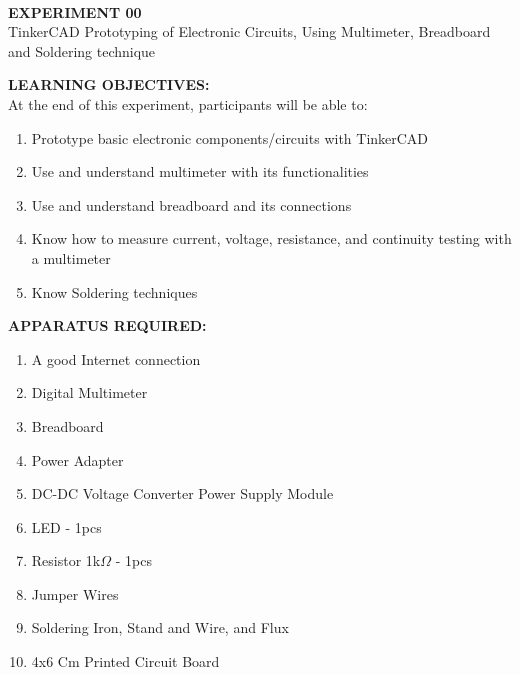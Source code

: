 \documentclass[12pt,a4paper]{article}
\begin{document}
\begin{center}
\textbf{\large \\EXPERIMENT 00 }\\[6pt]
TinkerCAD Prototyping of Electronic Circuits, Using Multimeter, Breadboard and Soldering technique
\end{center}

\textbf{\large LEARNING OBJECTIVES:}\\[3pt]
At the end of this experiment, participants will be able to:\vspace{-6mm}\begin{enumerate}
 \setlength\itemsep{-0.3em}
\item Prototype basic electronic components/circuits with TinkerCAD
\item Use and understand multimeter with its functionalities
\item Use and understand breadboard and its connections
\item Know how to measure current, voltage, resistance, and continuity testing with a multimeter
\item Know Soldering techniques 
\end{enumerate}

\textbf{\large APPARATUS REQUIRED:}\\
\vspace{-3mm}
\begin{enumerate}
 \setlength\itemsep{-0.3em}
\item A good Internet connection
\item Digital Multimeter
\item Breadboard
\item Power Adapter
\item DC-DC Voltage Converter Power Supply Module
\item LED - 1pcs
\item Resistor 1k$\Omega$ - 1pcs
\item Jumper Wires
\item Soldering Iron, Stand and Wire, and Flux
\item 4x6 Cm Printed Circuit Board
\end{enumerate}
\end{document}
